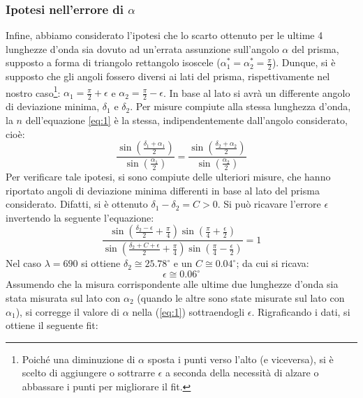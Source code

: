 \documentclass[10pt,twocolumn]{article}
\begin{document}
\subsubsection{Ipotesi nell'errore di $\alpha$}
Infine, abbiamo considerato l'ipotesi che lo scarto ottenuto per le ultime 4 lunghezze d'onda sia dovuto ad un'errata assunzione sull'angolo $\alpha$ del prisma, supposto a forma di triangolo rettangolo isoscele ($\alpha_1^* = \alpha_2^*= \frac{\pi}{2}$).
\noindent Dunque, si è supposto che gli angoli fossero diversi ai lati del prisma, rispettivamente nel nostro caso\footnote{Poiché una diminuzione di $\alpha$ sposta i punti verso l'alto (e viceversa), si è scelto di aggiungere o sottrarre $\epsilon$ a seconda della necessità di alzare o abbassare i punti per migliorare il fit.}:
 $\alpha_1 = \frac{\pi}{2} + \epsilon$ e $\alpha_2 = \frac{\pi}{2} - \epsilon$. In base al lato si avrà un differente angolo di deviazione minima, $\delta_1$ e $\delta_2$.
Per misure compiute alla stessa lunghezza d'onda, la $n$ dell'equazione \eqref{eq:1} è la stessa, indipendentemente dall'angolo considerato, cioè:
\begin{equation}
  \frac{\sin(\frac{\delta_1+\alpha_1}{2})}{\sin(\frac{\alpha_1}{2})} =\frac{\sin(\frac{\delta_2+\alpha_2}{2})}{\sin(\frac{\alpha_2}{2})} 
\end{equation}
Per verificare tale ipotesi, si sono compiute delle ulteriori misure, che hanno riportato angoli di deviazione minima differenti in base al lato del prisma considerato.
Difatti, si è ottenuto $\delta_1 - \delta_2 = C > 0$. Si può ricavare l'errore $\epsilon$ invertendo la seguente l'equazione:
\begin{equation}
  \frac{\sin\left(\frac{\delta_2 - \epsilon}{2} + \frac{\pi}{4}\right)\sin\left(\frac{\pi}{4} + \frac{\epsilon}{2}\right)}{\sin\left(\frac{\delta_2 + C + \epsilon}{2} + \frac{\pi}{4}\right)\sin\left(\frac{\pi}{4} - \frac{\epsilon}{2}\right)} = 1
\end{equation}
Nel caso $\lambda = 690$ si ottiene $\delta_2 \cong 25.78^{\circ}$ e un $C \cong 0.04^{\circ}$; da cui si ricava:
\begin{equation*}
  \boxed{\epsilon \cong 0.06^{\circ}}
\end{equation*}
Assumendo che la misura corrispondente alle ultime due lunghezze d'onda sia stata misurata sul lato con $\alpha_2$ (quando le altre sono state misurate sul lato con $\alpha_1$),
si corregge il valore di $\alpha$ nella (\ref{eq:1}) sottraendogli $\epsilon$. Rigraficando i dati, si ottiene il seguente fit:
\end{document}
